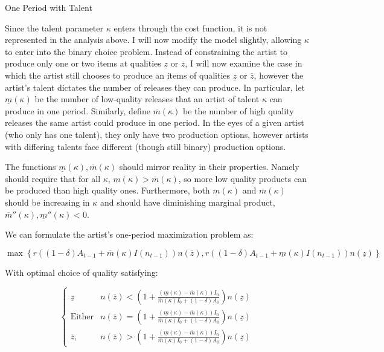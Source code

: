 \documentclass[
]{article}
\begin{document}
One Period with Talent

Since the talent parameter \(\kappa\) enters through the cost function,
it is not represented in the analysis above. I will now modify the model
slightly, allowing \(\kappa\) to enter into the binary choice problem.
Instead of constraining the artist to produce only one or two items at
qualities \(\underline{z}\) or \(\overline{z}\), I will now examine the
case in which the artist still chooses to produce an items of qualities
\(\underline{z}\) or \(\overline{z}\), however the artist's talent
dictates the number of releases they can produce. In particular, let
\(\underline{m}(\kappa)\) be the number of low-quality releases that an
artist of talent \(\kappa\) can produce in one period. Similarly, define
\(\overline{m}(\kappa)\) be the number of high quality releases the same
artist could produce in one period. In the eyes of a given artist (who
only has one talent), they only have two production options, however
artists with differing talents face different (though still binary)
production options.

The functions \(\underline m(\kappa),\overline m(\kappa)\) should mirror
reality in their properties. Namely should require that for all
\(\kappa\), \(\underline m(\kappa)>\overline m(\kappa)\), so more low
quality products can be produced than high quality ones. Furthermore,
both \(\underline m(\kappa)\) and \(\overline m(\kappa)\) should be
increasing in \(\kappa\) and should have diminishing marginal product,
\(\overline m''(\kappa),\underline m''(\kappa)<0\).

We can formulate the artist's one-period maximization problem as:

\begin{equation} \label{eq:binary_choice_talent}
\max\left\{r\left((1-\delta)A_{t-1}+\overline m(\kappa)I(n_{t-1})\right)n(\overline{z}),r\left((1-\delta)A_{t-1}+\underline m(\kappa)I(n_{t-1})\right)n(\underline{z}) \right\}
\end{equation}

With optimal choice of quality satisfying:

\begin{equation} \label{eq:one_period_talent_behavior}
\begin{cases}
\underline{z} &  n(\overline z) < \left(1+\frac{(\underline{m}(\kappa)-\overline{m}(\kappa))I_0}{\overline{m}(\kappa)I_0+(1-\delta)A_0}\right)n(\underline z)\\
\textrm{Either} & n(\overline z) = \left(1+\frac{(\underline{m}(\kappa)-\overline{m}(\kappa))I_0}{\overline{m}(\kappa)I_0+(1-\delta)A_0}\right)n(\underline z) \\
\overline{z}, &  n(\overline z) > \left(1+\frac{(\underline{m}(\kappa)-\overline{m}(\kappa))I_0}{\overline{m}(\kappa)I_0+(1-\delta)A_0}\right)n(\underline z)
\end{cases}
\end{equation}
\end{document}
